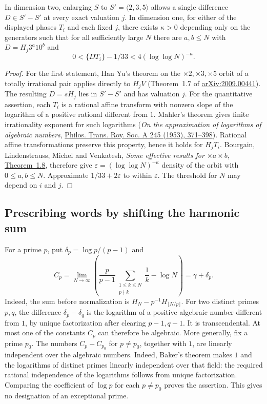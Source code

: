 \documentclass[11pt,a4paper]{article}
\theoremstyle{definition}\newtheorem{definition}[theorem]{Definition}\newtheorem{example}[theorem]{Example}
\theoremstyle{remark}\newtheorem{remark}[theorem]{Remark}
\begin{document}
\begin{corollary}\label{cor:smooth-refinements}
In dimension two, enlarging $S$ to $S'=\langle2,3,5\rangle$ allows a single
difference $D\in S'-S'$ at every exact valuation $j$. In dimension one, for
either of the displayed phases $T_i$ and each fixed $j$, there exists
$\kappa>0$ depending only on the generators such that for all sufficiently
large $N$ there are $a,b\le N$ with $D=H_j3^a10^b$ and
\[
 0<\{DT_i\}-1/33<4(\log\log N)^{-\kappa}.
\]
\end{corollary}
\begin{proof}
For the first statement, Han Yu's theorem on the $\times2,\times3,\times5$
orbit of a totally irrational pair applies directly to $H_jV$ (Theorem~1.7
of \href{https://arxiv.org/abs/2009.00441}{arXiv:2009.00441}). The resulting
$D=sH_j$ lies in $S'-S'$ and has valuation $j$. For the quantitative assertion,
each $T_i$ is a rational affine transform with nonzero slope of the logarithm
of a positive rational different from $1$. Mahler's theorem gives finite
irrationality exponent for such logarithms (\emph{On the approximation of
logarithms of algebraic numbers},
\href{https://doi.org/10.1098/rsta.1953.0001}{Philos. Trans. Roy. Soc. A
245 (1953), 371--398}). Rational affine transformations preserve this
property, hence it holds for $H_jT_i$. Bourgain, Lindenstrauss, Michel and
Venkatesh, \emph{Some effective results for $\times a\times b$},
\href{https://math.stanford.edu/~akshay/research/blmv.pdf}{Theorem~1.8},
therefore give $\varepsilon=(\log\log N)^{-\kappa}$ density of the orbit
with $0\le a,b\le N$. Approximate $1/33+2\varepsilon$ to within
$\varepsilon$. The threshold for $N$ may depend on $i$ and $j$.
\end{proof}

\subsection{Prescribing words by shifting the harmonic sum}
For a prime $p$, put $\delta_p=\log p/(p-1)$ and
\[
 C_p=\lim_{N\to\infty}\left(
  \frac{p}{p-1}\sum_{\substack{1\le k\le N\\p\nmid k}}\frac1k-\log N\right)
 =\gamma+\delta_p.
\]
Indeed, the sum before normalization is $H_N-p^{-1}H_{\lfloor N/p\rfloor}$.
For two distinct primes $p,q$, the difference $\delta_p-\delta_q$ is the
logarithm of a positive algebraic number different from $1$, by unique
factorization after clearing $p-1,q-1$. It is transcendental. At most one
of the constants $C_p$ can therefore be algebraic. More generally, fix a
prime $p_0$. The numbers $C_p-C_{p_0}$ for $p\ne p_0$, together with $1$,
are linearly independent over the algebraic numbers. Indeed, Baker's theorem
makes $1$ and the logarithms of distinct primes linearly independent over
that field: the required rational independence of the logarithms follows
from unique factorization. Comparing the coefficient of $\log p$ for each
$p\ne p_0$ proves the assertion. This gives no designation of an exceptional
prime.
\end{document}
